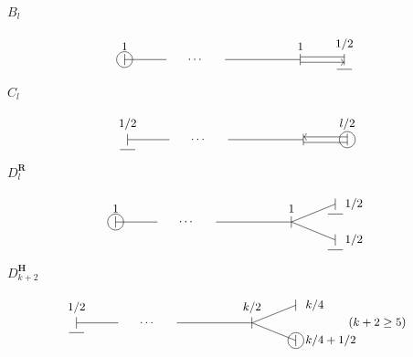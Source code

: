 \documentclass[10pt,a4paper]{article}
\begin{document}
\(B_l\)

\[
\begin{tikzpicture}[x=1.15cm,y=0.75cm,baseline=(current bounding box.center),every node/.style={font=\small}]
\node[circle,draw,inner sep=1.2pt] at (0,0) {$\vert$}; \draw (0,0)--(1,0); \node at (1.7,0) {$\cdots$}; \draw (2.4,0)--(4.2,0); \node at (4.2,0) {$\vert$}; \node at (5.25,0) {$\vert$};
\draw (4.2,0.10)--(5.25,0.10); \draw[->] (4.2,-0.10)--(5.25,-0.10);
\node[above,yshift=4pt] at (0,0) {$1$}; \node[above,yshift=4pt] at (4.2,0) {$1$}; \node[above,yshift=4pt] at (5.25,0) {$1/2$};
\draw (5.07,-0.36)--(5.43,-0.36);
\end{tikzpicture}
\]

\(C_l\)

\[
\begin{tikzpicture}[x=1.15cm,y=0.75cm,baseline=(current bounding box.center),every node/.style={font=\small}]
\node at (0,0) {$\vert$}; \draw (0,0)--(1,0); \node at (1.7,0) {$\cdots$}; \draw (2.4,0)--(4.2,0); \node at (4.2,0) {$\vert$}; \node[circle,draw,inner sep=1.2pt] at (5.25,0) {$\vert$};
\draw[<-] (4.2,0.10)--(5.25,0.10); \draw (4.2,-0.10)--(5.25,-0.10);
\node[above,yshift=4pt] at (0,0) {$1/2$}; \node[above,yshift=4pt] at (5.25,0) {$l/2$};
\draw (-0.18,-0.36)--(0.18,-0.36);
\end{tikzpicture}
\]

\(D_l^{\mathbf R}\)

\[
\begin{tikzpicture}[x=1.15cm,y=0.75cm,baseline=(current bounding box.center),every node/.style={font=\small}]
\node[circle,draw,inner sep=1.2pt] at (0,0) {$\vert$}; \draw (0,0)--(1,0); \node at (1.7,0) {$\cdots$}; \draw (2.4,0)--(4.2,0); \node at (4.2,0) {$\vert$};
\draw (4.2,0)--(5.25,0.65); \draw (4.2,0)--(5.25,-0.65); \node at (5.25,0.65) {$\vert$}; \node at (5.25,-0.65) {$\vert$};
\node[above,yshift=4pt] at (0,0) {$1$}; \node[above,yshift=4pt] at (4.2,0) {$1$}; \node[right,xshift=4pt] at (5.25,0.65) {$1/2$}; \node[right,xshift=4pt] at (5.25,-0.65) {$1/2$};
\draw (5.07,0.29)--(5.43,0.29); \draw (5.07,-1.01)--(5.43,-1.01);
\end{tikzpicture}
\]

\(D_{k+2}^{\mathbf H}\)

\[
\begin{tikzpicture}[x=1.15cm,y=0.75cm,baseline=(current bounding box.center),every node/.style={font=\small}]
\node at (0,0) {$\vert$}; \draw (0,0)--(1,0); \node at (1.7,0) {$\cdots$}; \draw (2.4,0)--(4.2,0); \node at (4.2,0) {$\vert$};
\draw (4.2,0)--(5.25,0.65); \draw (4.2,0)--(5.25,-0.65); \node at (5.25,0.65) {$\vert$}; \node[circle,draw,inner sep=1.2pt] at (5.25,-0.65) {$\vert$};
\node[above,yshift=4pt] at (0,0) {$1/2$}; \node[above,yshift=4pt] at (4.2,0) {$k/2$}; \node[right,xshift=4pt] at (5.25,0.65) {$k/4$}; \node[right,xshift=4pt] at (5.25,-0.65) {$k/4+1/2$}; \node at (7.2,0) {$(k+2\ge5)$};
\draw (-0.18,-0.36)--(0.18,-0.36);
\end{tikzpicture}
\]
\end{document}
